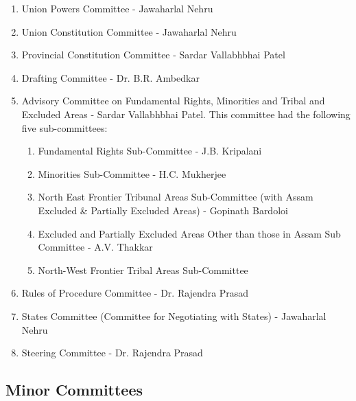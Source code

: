 \begin{multicol}{2}
\begin{enumerate}
  \item Union Powers Committee - Jawaharlal Nehru
  \item Union Constitution Committee - Jawaharlal Nehru
  \item Provincial Constitution Committee - Sardar Vallabhbhai Patel
  \item Drafting Committee - Dr. B.R. Ambedkar
  \item Advisory Committee on Fundamental Rights, Minorities and Tribal and Excluded Areas - Sardar Vallabhbhai Patel. This committee had the following five sub-committees:
  \begin{enumerate}
    \item Fundamental Rights Sub-Committee - J.B. Kripalani
    \item Minorities Sub-Committee - H.C. Mukherjee
    \item North East Frontier Tribunal Areas Sub-Committee (with Assam Excluded \& Partially Excluded Areas) - Gopinath Bardoloi
    \item Excluded and Partially Excluded Areas Other than those in Assam Sub Committee - A.V. Thakkar
    \item North-West Frontier Tribal Areas Sub-Committee\endnote
  \end{enumerate}

  \item Rules of Procedure Committee - Dr. Rajendra Prasad
  \item States Committee (Committee for Negotiating with States) - Jawaharlal Nehru
  \item Steering Committee - Dr. Rajendra Prasad
\end{enumerate}

\subsection{Minor Committees}


\end{multicol}
